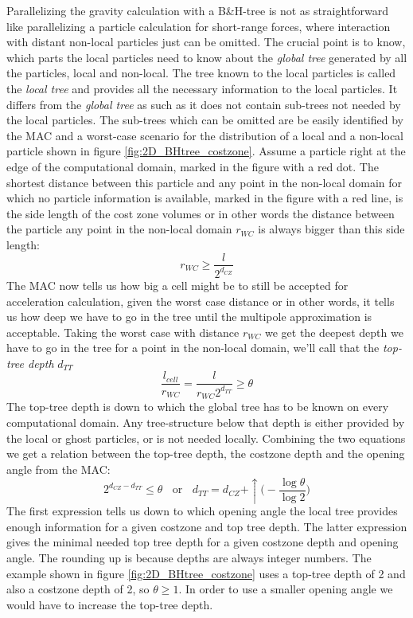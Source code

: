 Parallelizing the gravity calculation with a  B\&H-tree is not as straightforward like parallelizing a particle calculation for short-range forces, where interaction with distant non-local particles just can be omitted. The crucial point is to know, which parts the local particles need to know about the \emph{global tree} generated by all the particles, local and non-local. The tree known to the local particles is called the \emph{local tree} and provides all the necessary information to the local particles. It differs from the \emph{global tree} as such as it does not contain sub-trees not needed by the local particles. The sub-trees which can be omitted are be easily identified by the MAC and a worst-case scenario for the distribution of a local and a non-local particle shown in figure \ref{fig:2D_BHtree_costzone}. Assume a particle right at the edge of the computational domain, marked in the figure with a red dot. The shortest distance between this particle and any point in the non-local domain for which no particle information is available, marked in the figure with a red line, is the side length of the cost zone volumes or in other words the distance between the particle any point in the non-local domain $r_{WC}$ is always bigger than this side length:
\begin{equation}
r_{WC} \ge \frac{l}{2^{d_{CZ}} } 
\end{equation}
The MAC now tells us how big a cell might be to still be accepted for acceleration calculation, given the worst case distance or in other words, it tells us how deep we have to go in the tree until the multipole approximation is acceptable. Taking the worst case with distance $r_{WC}$ we get the deepest depth we have to go in the tree for a point in the non-local domain, we'll call that the \emph{top-tree depth} $d_{TT}$
\begin{equation}
\frac{l_{cell}}{r_{WC}} = \frac{l}{r_{WC} 2^{d_{TT}}} \ge \theta
\end{equation}
The top-tree depth is down to which the global tree has to be known on every computational domain. Any tree-structure below that depth is either provided by the local or ghost particles, or is not needed locally. Combining the two equations we get a relation between the top-tree depth, the costzone depth and the opening angle from the MAC:
\begin{equation}
2^{d_{CZ} - d_{TT}} \le \theta ~~~~\text{or}~~~~ d_{TT} = d_{CZ} + \uparrow \Big( - \frac{ \log{\theta} }{\log{2} } \Big)
\end{equation}
The first expression tells us down to which opening angle the local tree provides enough information for a given costzone and top tree depth. The latter expression gives the minimal needed top tree depth for a given costzone depth and opening angle. The rounding up is because depths are always integer numbers. The example shown in  figure \ref{fig:2D_BHtree_costzone} uses a top-tree depth of 2 and also a costzone depth of 2, so $\theta \ge 1$. In order to use a smaller opening angle we would have to increase the top-tree depth.\\

